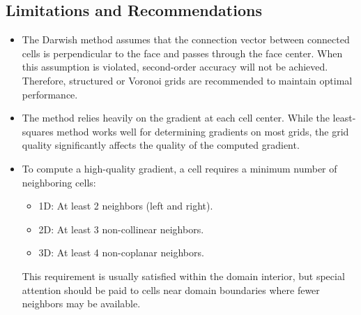 \subsection{Limitations and Recommendations}
\begin{itemize}
	\item The Darwish method assumes that the connection vector between connected cells is perpendicular to the face and passes through the face center. When this assumption is violated, second-order accuracy will not be achieved. Therefore, structured or Voronoi grids are recommended to maintain optimal performance.
	\item The method relies heavily on the gradient at each cell center. While the least-squares method works well for determining gradients on most grids, the grid quality significantly affects the quality of the computed gradient.
	\item To compute a high-quality gradient, a cell requires a minimum number of neighboring cells:
	\begin{itemize} 
		\item 1D: At least 2 neighbors (left and right).
		\item 2D: At least 3 non-collinear neighbors.
		\item 3D: At least 4 non-coplanar neighbors.
	\end{itemize}
	This requirement is usually satisfied within the domain interior, but special attention should be paid to cells near domain boundaries where fewer neighbors may be available.
\end{itemize}


